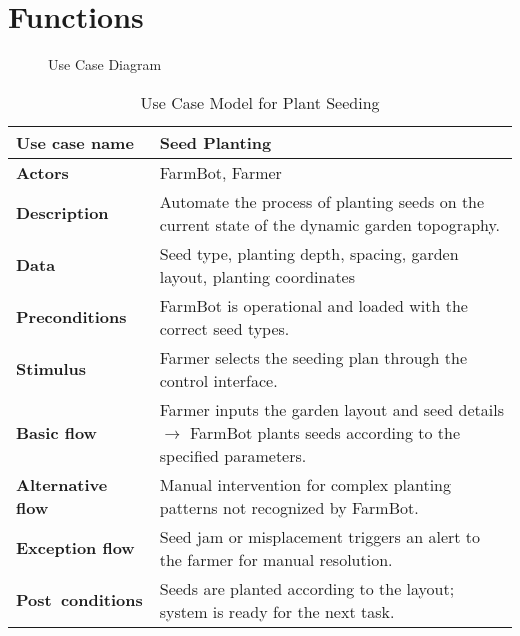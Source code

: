 \section{Functions}

\begin{figure}[H]
    \centering

\caption{Use Case Diagram}
\end{figure}
    
\begin{table}[H]
\centering
\footnotesize
\begin{tabular}{|p{3.5cm}|p{8.5cm}|}
\hline
\textbf{Use case name}    & Seed Planting \\
\hline
\textbf{Actors}           & FarmBot, Farmer \\
\hline
\textbf{Description}      & Automate the process of planting seeds on the current state of the dynamic garden topography. \\
\hline
\textbf{Data}             & Seed type, planting depth, spacing, garden layout, planting coordinates \\
\hline
\textbf{Preconditions}    & FarmBot is operational and loaded with the correct seed types. \\
\hline
\textbf{Stimulus}         & Farmer selects the seeding plan through the control interface. \\
\hline
\textbf{Basic flow}       & Farmer inputs the garden layout and seed details $\rightarrow$ FarmBot plants seeds according to the specified parameters. \\
\hline
\textbf{Alternative flow} & Manual intervention for complex planting patterns not recognized by FarmBot. \\
\hline
\textbf{Exception flow}   & Seed jam or misplacement triggers an alert to the farmer for manual resolution. \\
\hline
\textbf{Post conditions}  & Seeds are planted according to the layout; system is ready for the next task. \\
\hline
\end{tabular}
\caption{Use Case Model for Plant Seeding}
\end{table}

